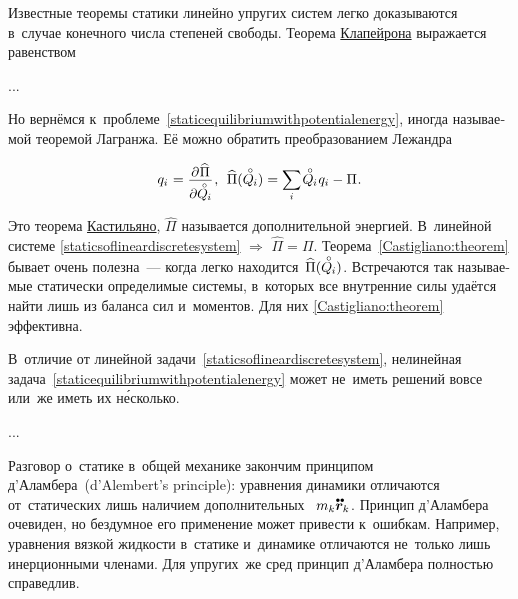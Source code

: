 \begin{otherlanguage}{russian}
Известные теоремы статики линейно упругих систем легко доказываются в~случае конечного числа степеней свободы. Теорема \href{https://en.wikipedia.org/wiki/Beno%C3%AEt_Paul_%C3%89mile_Clapeyron}{Клапейрона} выражается равенством

...

Но вернёмся к~проблеме~\eqref{staticequilibriumwithpotentialenergy}, иногда называемой теоремой Лагранжа. Её можно обратить преобразованием Лежандра

\nopagebreak\vspace{-0.16em}\begin{equation}\label{Castigliano:theorem}
q_i \hspace{.1ex} = \scalebox{0.96}{$ \displaystyle \frac{\raisemath{-0.12em}{\partial \hspace{.1ex} \widehat{\Pi}}}{\raisemath{-0.4em}{\partial \mathcircabove{Q}_{\hspace{-0.1ex}i}}} $} \hspace{.16ex} ,
\:\:
\widehat{\Pi}(\mathcircabove{Q}_{\hspace{-0.1ex}i})
= \scalebox{0.95}[1]{$\displaystyle \sum_{\smash{i}}$} \hspace{.2ex} \mathcircabove{Q}_{\hspace{-0.1ex}i} \hspace{.12ex} q_i - \Pi
\hspace{.1ex} .
\end{equation}

\vspace{-0.2em} \noindent Это теорема \href{https://en.wikipedia.org/wiki/Carlo_Alberto_Castigliano}{Кастильяно}, $\widehat{\Pi}$ называется дополнительной энергией. В~линейной системе \eqref{staticsoflineardiscretesystem} ${\Rightarrow}$ ${\widehat{\Pi} = \Pi}$. Теорема~\eqref{Castigliano:theorem} бывает очень полезна~--- когда легко находится~${\widehat{\Pi}(\mathcircabove{Q}_{\hspace{-0.1ex}i})}$. Встречаются так называемые статически определимые системы, в~которых все внутренние силы удаётся найти лишь из баланса сил и~моментов. Для них \eqref{Castigliano:theorem} эффективна.

В~отличие от линейной задачи~\eqref{staticsoflineardiscretesystem}, нелинейная задача~\eqref{staticequilibriumwithpotentialenergy} может не~иметь решений вовсе или~же иметь их н\'{е}сколько.

...

Разговор о~статике в~общей механике закончим принципом д’Аламбера~(d’Alembert’s principle): уравнения динамики отличаются от~статических лишь наличием дополнительных ~${m_k \mathdotdotabove{\bm{r}}_k}$. Принцип д’Аламбера очевиден, но бездумное его применение может привести к~ошибкам. Например, уравнения вязкой жидкости в~статике и~динамике отличаются не~только лишь инерционными членами. Для упругих~же сред принцип д’Аламбера полностью справедлив.

\end{otherlanguage}

